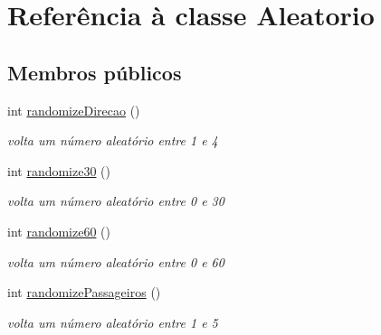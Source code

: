 \hypertarget{class_aleatorio}{}\section{Referência à classe Aleatorio}
\label{class_aleatorio}
\subsection*{Membros públicos}
\begin{DoxyCompactItemize}
\item 
\mbox{\label{class_aleatorio_ae502842e6db3781764f96455e8ae943d}} 
int \mbox{\hyperlink{class_aleatorio_ae502842e6db3781764f96455e8ae943d}{randomize\+Direcao}} ()
\begin{DoxyCompactList}\small\item\em volta um número aleatório entre 1 e 4 \end{DoxyCompactList}\item 
\mbox{\label{class_aleatorio_abe19d3fdd490cbe1c2122c1ac3fde341}} 
int \mbox{\hyperlink{class_aleatorio_abe19d3fdd490cbe1c2122c1ac3fde341}{randomize30}} ()
\begin{DoxyCompactList}\small\item\em volta um número aleatório entre 0 e 30 \end{DoxyCompactList}\item 
\mbox{\label{class_aleatorio_aa0ed910c0a9988620f962c62bd714367}} 
int \mbox{\hyperlink{class_aleatorio_aa0ed910c0a9988620f962c62bd714367}{randomize60}} ()
\begin{DoxyCompactList}\small\item\em volta um número aleatório entre 0 e 60 \end{DoxyCompactList}\item 
\mbox{\label{class_aleatorio_a75294eb03a9c18a067f0223b505e4832}} 
int \mbox{\hyperlink{class_aleatorio_a75294eb03a9c18a067f0223b505e4832}{randomize\+Passageiros}} ()
\begin{DoxyCompactList}\small\item\em volta um número aleatório entre 1 e 5 \end{DoxyCompactList}\item 
\mbox{\label{class_aleatorio_a2a4832bca1561b9c4b47a28427599607}} 

\end{DoxyCompactItemize}
